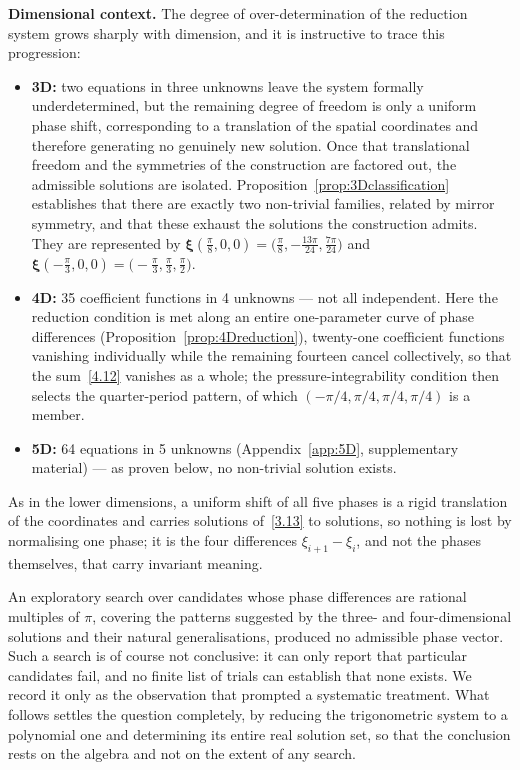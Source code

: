 \documentclass[11pt]{jfm}
\numberwithin{equation}{section}
\begin{document}
\noindent \textbf{Dimensional context.} The degree of over-determination of the reduction system grows sharply with dimension, and it is instructive to trace this progression:
\begin{itemize}
    \item \textbf{3D:} two equations in three unknowns leave the system formally
    underdetermined, but the remaining degree of freedom is only a uniform phase shift,
    corresponding to a translation of the spatial coordinates and therefore generating no
    genuinely new solution. Once that translational freedom and the symmetries of the
    construction are factored out, the admissible solutions are isolated.
    Proposition~\ref{prop:3Dclassification} establishes that there are exactly two non-trivial
    families, related by mirror symmetry, and that these exhaust the solutions the construction
    admits. They are represented by $\boldsymbol{\xi}(\tfrac{\pi}{8},0,0)
    =\bigl(\tfrac{\pi}{8},-\tfrac{13\pi}{24},\tfrac{7\pi}{24}\bigr)$ and
    $\boldsymbol{\xi}(-\tfrac{\pi}{3},0,0)=\bigl(-\tfrac{\pi}{3},\tfrac{\pi}{3},
    \tfrac{\pi}{2}\bigr)$.
    \item \textbf{4D:} 35 coefficient functions in 4 unknowns --- not all independent. Here the
    reduction condition is met along an entire one-parameter curve of phase differences
    (Proposition~\ref{prop:4Dreduction}), twenty-one coefficient functions vanishing individually
    while the remaining fourteen cancel collectively, so that the sum~\eqref{4.12} vanishes as a
    whole; the pressure-integrability condition then selects the quarter-period pattern, of which
    $(-\pi/4, \pi/4, \pi/4, \pi/4)$ is a member.
    \item \textbf{5D:} 64 equations in 5 unknowns (Appendix~\ref{app:5D},
    supplementary material) --- as proven below, no non-trivial solution exists.
\end{itemize}
As in the lower dimensions, a uniform shift of all five phases is a rigid translation of the
coordinates and carries solutions of~\eqref{3.13} to solutions, so nothing is lost by normalising
one phase; it is the four differences $\xi_{i+1}-\xi_i$, and not the phases themselves, that carry
invariant meaning.

An exploratory search over candidates whose phase differences are rational multiples of $\pi$,
covering the patterns suggested by the three- and four-dimensional solutions and their natural
generalisations, produced no admissible phase vector. Such a search is of course not conclusive:
it can only report that particular candidates fail, and no finite list of trials can establish
that none exists. We record it only as the observation that prompted a systematic treatment. What
follows settles the question completely, by reducing the trigonometric system to a polynomial one
and determining its entire real solution set, so that the conclusion rests on the algebra and not
on the extent of any search.
\end{document}
